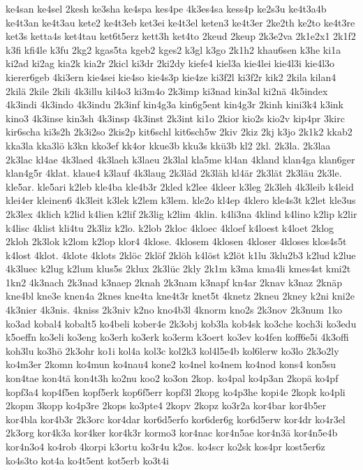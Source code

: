 {ke4san
ke4sel
2kesh
ke3sha
ke4spa
kes4pe
4k3es4sa
kess4p
ke2s3u
ke4t3a4b
ke4t3an
ke4t3au
kete2
ke4t3eb
ket3ei
ke4t3el
keten3
ke4t3er
2ke2th
ke2to
ke4t3re
ket3s
ketta4s
ket4tau
ket6t5erz
kett3h
ket4to
2keud
2keup
2k3e2va
2k1e2x1
2k1f2
k3fi
kfi4le
k3fu
2kg2
kgas5ta
kgeb2
kges2
k3gl
k3go
2k1h2
khau6sen
k3he
ki1a
ki2ad
ki2ag
kia2k
kia2r
2kicl
ki3dr
2ki2dy
kiefe4
kiel3a
kie4lei
kie4l3i
kie4l3o
kierer6geb
4ki3ern
kie4sei
kie4so
kie4s3p
kie4ze
ki3f2l
ki3f2r
kik2
2kila
kilan4
2kilä
2kile
2kili
4k3illu
kil4o3
ki3m4o
2k3imp
ki3nad
kin3al
ki2nä
4k5index
4k3indi
4k3indo
4k3indu
2k3inf
kin4g3a
kin6g5ent
kin4g3r
2kinh
kini3k4
k3ink
kino3
4k3inse
kin3sh
4k3insp
4k3inst
2k3int
ki1o
2kior
kio2s
kio2v
kip4pr
3kirc
kir6scha
ki3s2h
2k3i2so
2kis2p
kit6schl
kit6sch5w
2kiv
2kiz
2kj
k3jo
2k1k2
kkab2
kka3la
kka3lö
k3kn
kko3ef
kk4or
kkue3b
kku3s
kkü3b
kl2
2kl.
2k3la.
2k3laa
2k3lac
kl4ae
4k3laed
4k3laeh
k3laeu
2k3lal
kla5me
kl4an
4kland
klan4ga
klan6ger
klan4g5r
4klat.
klaue4
k3lauf
4k3laug
2k3läd
2k3läh
kl4är
2k3lät
2k3läu
2k3le.
kle5ar.
kle5ari
k2leb
kle4ba
kle4b3r
2kled
k2lee
4kleer
k3leg
2k3leh
4k3leib
k4leid
klei4er
kleinen6
4k3leit
k3lek
k2lem
k3lem.
kle2o
kl4ep
4klero
kle4s3t
k2let
kle3us
2k3lex
4klich
k2lid
k4lien
k2lif
2k3lig
k2lim
4klin.
k4li3na
4klind
k4lino
k2lip
k2lir
k4lisc
4klist
kli4tu
2k3liz
k2lo.
k2lob
2kloc
4kloec
4kloef
k4loest
k4loet
2klog
2kloh
2k3lok
k2lom
k2lop
klor4
4klose.
4klosem
4klosen
4kloser
4kloses
klos4s5t
k4lost
4klot.
4klote
4klots
2klöc
2klöf
2klöh
k4löst
k2löt
k1lu
3klu2b3
k2lud
k2lue
4k3luec
k2lug
k2lum
klus5s
2klux
2k3lüc
2kly
2k1m
k3ma
kma4li
kmes4st
kmi2t
1kn2
4k3nach
2k3nad
k3naep
2knah
2k3nam
k3napf
kn4ar
2knav
k3naz
2knäp
kne4bl
kne3e
knen4a
2knes
kne4ta
kne4t3r
knet5t
4knetz
2kneu
2kney
k2ni
kni2e
4k3nier
4k3nis.
4kniss
2k3niv
k2no
kno4b3l
4knorm
kno2s
2k3nov
2k3num
1ko
ko3ad
kobal4
kobalt5
ko4beli
kober4e
2k3obj
kob3la
kob4sk
ko3che
koch3i
ko3edu
k5oeffn
ko3eli
ko3eng
ko3erh
ko3erk
ko3erm
k3oert
ko3ev
ko4fen
koff6e5i
4k3offi
koh3lu
ko3hö
2k3ohr
ko1i
kol4a
kol3c
kol2k3
kol4l5e4b
kol6lerw
ko3lo
2k3o2ly
ko4m3er
2komn
ko4mun
ko4nau4
kone2
ko4nel
ko4nem
ko4nod
kons4
kon5su
kon4tae
kon4tä
kon4t3h
ko2nu
koo2
ko3on
2kop.
ko4pal
ko4p3an
2kopä
ko4pf
kopf3a4
kop4f5en
kopf5erk
kop6f5err
kopf3l
2kopg
ko4p3he
kopi4e
2kopk
ko4pli
2kopm
3kopp
ko4p3re
2kops
ko3pte4
2kopv
2kopz
ko3r2a
kor4bar
kor4b5er
kor4bla
kor4b3r
2k3orc
kor4dar
kor6d5erfo
kor6der6g
kor6d5erw
kor4dr
ko4r3el
2k3org
kor4k3a
kor4ker
kor4k3r
kormo3
kor4nac
kor4n5ae
kor4n3ä
kor4n5e4b
kor4n3o4
ko4rob
4korpi
k3ortu
ko3r4u
k2os.
ko4scr
ko2sk
kos4pr
kost5er6z
ko4s3to
kot4a
ko4t5ent
kot5erb
ko3t4i
}
